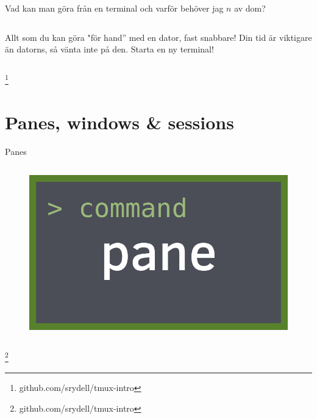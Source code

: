 \documentclass[10pt]{beamer}
\newcommand\blfootnote[1]{%
  \begingroup
  \renewcommand\thefootnote{}\footnote{#1}%
  \addtocounter{footnote}{-1}%
  \endgroup
}
\begin{document}
\begin{frame}{Vad kan man göra från en terminal och varför behöver jag $n$ av dom?}
    \begin{columns}[c]
        \column{2in}
            Allt som du kan göra "för hand'' med en dator, fast snabbare!
        \column{2in}
            Din tid är viktigare än datorns, så vänta inte på den. Starta en ny terminal!
    \end{columns}
    \blfootnote{github.com/srydell/tmux-intro}
\end{frame}

\section{Panes, windows \& sessions}

\begin{frame}{Panes}
    \begin{columns}[c]
        \column{4in}
            \begin{figure}[h!]
                \centering
                \includegraphics[width=1\textwidth]{../figures/pane.png}
            \end{figure}
    \end{columns}
    \blfootnote{github.com/srydell/tmux-intro}
\end{frame}
\end{document}
